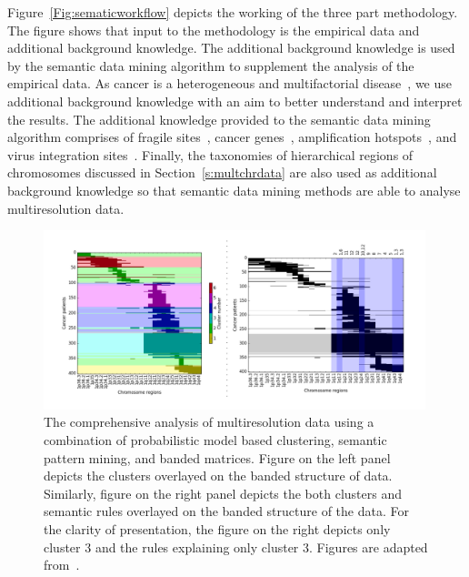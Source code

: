 Figure~\ref{Fig:sematicworkflow} depicts the working of the three
part methodology. The figure shows that input to the methodology 
is the empirical data and additional background knowledge. 
The additional background knowledge is used by the 
semantic data mining algorithm to supplement the analysis of the
empirical data. As cancer is a heterogeneous and multifactorial 
disease~\cite{king2002genetic}, we use additional background 
knowledge with an aim to better understand and
interpret the results. The additional knowledge 
provided to the semantic data mining algorithm comprises 
of fragile sites~\cite{durkin07,schwartz06}, cancer 
genes~\cite{futreal2004}, amplification hotspots~\cite{myllykangas06}, 
and virus integration sites~\cite{khoury2013,zurHausen2009}.
Finally, the taxonomies of hierarchical regions of chromosomes
discussed in Section~\ref{s:multchrdata} are also used as 
additional background knowledge so that semantic data mining
methods are able to analyse multiresolution data.

\begin{figure}[h!]
\centering
\includegraphics[trim=15mm 9mm 15mm 8mm,width=0.99\textwidth]{figures/clusterrules}
\caption[Visualisation of Clusters and Rules through Banded Matrices.]
{The comprehensive analysis of multiresolution data using
a combination of probabilistic model based clustering, 
semantic pattern mining, and banded matrices. Figure on 
the left panel depicts the clusters overlayed on the banded 
structure of data. Similarly, figure on the right panel depicts
the both clusters and semantic rules overlayed on the banded
structure of the data. For the clarity of presentation, the figure on
the right depicts only cluster 3 and the rules explaining only cluster 3.
Figures are adapted from~.} 
\label{Fig:clusterrules}
\end{figure}

